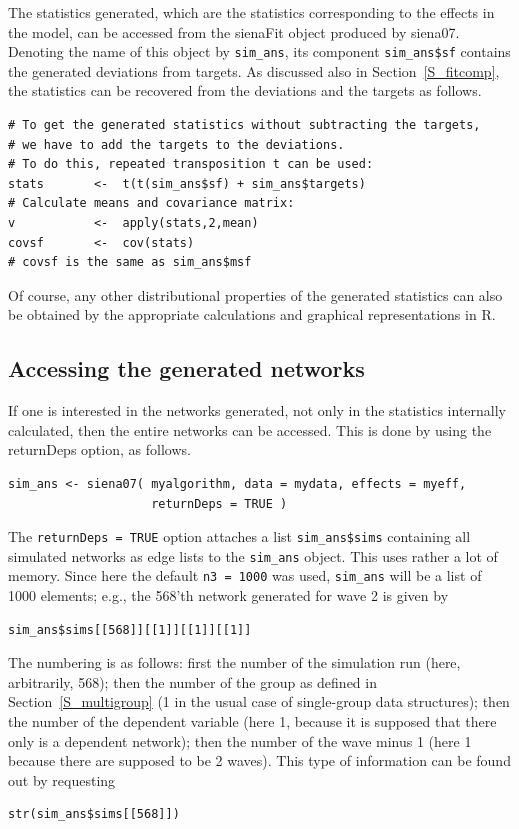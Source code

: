 \documentclass[a4paper,fleqn,11pt]{article}
\newcommand{\+}{\, + \,}
\newcommand{\Rn}{{\sf R}}
\begin{document}
The statistics generated, which are the statistics
corresponding to the effects in the model,
can be accessed from the \textsf{sienaFit}
object produced by \textsf{siena07}.
Denoting the name of this object by \texttt{sim\_ans},
its component  \texttt{sim\_ans\$sf} contains the generated
deviations from targets. As discussed also in Section~\ref{S_fitcomp},
the statistics can be recovered from the deviations and the targets
as follows.
\begin{verbatim}
# To get the generated statistics without subtracting the targets,
# we have to add the targets to the deviations.
# To do this, repeated transposition t can be used:
stats       <-  t(t(sim_ans$sf) + sim_ans$targets)
# Calculate means and covariance matrix:
v           <-  apply(stats,2,mean)
covsf       <-  cov(stats)
# covsf is the same as sim_ans$msf
\end{verbatim}
Of course, any other distributional properties of the
generated statistics can also be obtained by the
appropriate calculations and graphical representations in \Rn.

\subsection{Accessing the generated networks}
\label{S_sims}

If one is interested in the networks generated, not only
in the statistics internally calculated,
then the entire networks can be accessed.
This is done by using the \textsf{returnDeps} option, as follows.
\begin{verbatim}
sim_ans <- siena07( myalgorithm, data = mydata, effects = myeff,
                    returnDeps = TRUE )
\end{verbatim}
The \texttt{returnDeps = TRUE} option attaches a list \texttt{sim\_ans\$sims}
containing all simulated networks
as edge lists to the \texttt{sim\_ans} object.
This uses rather a lot of memory.
Since here the default \texttt{n3 = 1000} was used, \texttt{sim\_ans} will be
a list of 1000 elements; e.g., the 568'th network generated
for wave 2 is given by
\begin{verbatim}
sim_ans$sims[[568]][[1]][[1]][[1]]
\end{verbatim}
The numbering is as follows: first the number of the simulation run (here,
arbitrarily, 568); then the number of the group as defined in
Section~\ref{S_multigroup} (1 in the usual case of single-group data structures);
then the number of the dependent variable (here 1, because it is supposed
that there only is a dependent network);
then the number of the wave minus 1 (here 1 because there are supposed to be
2 waves).
This type of information can be found out by requesting
\begin{verbatim}
str(sim_ans$sims[[568]])
\end{verbatim}
\end{document}
